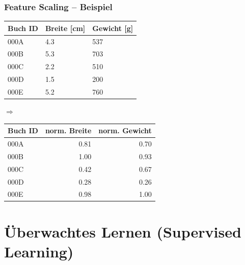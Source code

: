 \documentclass[aspectratio=169]{beamer}
\begin{document}
\begin{frame}
  \frametitle{Feature Scaling -- Beispiel}
  \begin{block}{}  
    \vspace{0.5cm}
    \begin{minipage}{0.43\textwidth}
      {\small
        \begin{tabular}{lll}
          \textbf{Buch ID} & \textbf{Breite [cm]} & \textbf{Gewicht [g]}\\
          \hline
          000A & 4.3 & 537\\
          000B & 5.3 & 703\\
          000C & 2.2 & 510\\
          000D & 1.5 & 200\\
          000E & 5.2 & 760\\
        \end{tabular}
      }
    \end{minipage}
    \begin{minipage}{0.08\textwidth}
      $\Rightarrow$
    \end{minipage}        
    \begin{minipage}{0.40\textwidth}
      {\small
        \begin{tabular}{lrr}
          \textbf{Buch ID} & \textbf{norm. Breite} & \textbf{norm. Gewicht}\\
          \hline
          000A & 0.81 & 0.70\\
          000B & 1.00 &  0.93\\
          000C & 0.42 & 0.67\\
          000D & 0.28 & 0.26\\
          000E & 0.98 & 1.00 \\
        \end{tabular}
      }
    \end{minipage}
    \hspace{1cm}
  \end{block}
\end{frame}

\section{Überwachtes Lernen (Supervised Learning)}

\begin{frame}{}
   \tableofcontents[currentsection]
\end{frame}
\end{document}
